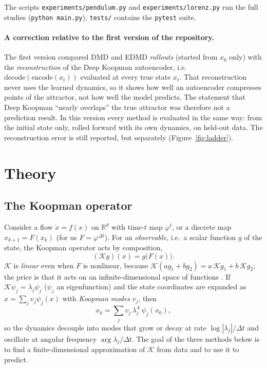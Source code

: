 \documentclass[11pt,a4paper]{article}
\newcommand{\R}{\mathbb{R}}
\newcommand{\Kop}{\mathcal{K}}
\newcommand{\code}[1]{\texttt{#1}}
\begin{document}
The scripts \code{experiments/pendulum.py} and \code{experiments/lorenz.py} run the full studies
(\code{python main.py}); \code{tests/} contains the \code{pytest} suite.

\paragraph{A correction relative to the first version of the repository.}
The first version compared DMD and EDMD \emph{rollouts} (started from $x_0$ only) with the
\emph{reconstruction} of the Deep Koopman autoencoder, i.e.\ $\mathrm{decode}(\mathrm{encode}(x_t))$
evaluated at every true state $x_t$. That reconstruction never uses the learned dynamics, so it
shows how well an autoencoder compresses points of the attractor, not how well the model predicts.
The statement that Deep Koopman ``nearly overlaps'' the true attractor was therefore not a
prediction result. In this version every method is evaluated in the same way: from the initial state
only, rolled forward with its own dynamics, on held-out data. The reconstruction error is still
reported, but separately (Figure~\ref{fig:ladder}).

\section{Theory}
\subsection{The Koopman operator}
Consider a flow $\dot x=f(x)$ on $\R^d$ with time-$t$ map $\varphi^t$, or a discrete map
$x_{k+1}=F(x_k)$ (for us $F=\varphi^{\Delta t}$). For an \emph{observable}, i.e.\ a scalar function
$g$ of the state, the Koopman operator acts by composition,
\begin{equation}
  (\Kop g)(x) = g\bigl(F(x)\bigr).
\end{equation}
$\Kop$ is \emph{linear} even when $F$ is nonlinear, because $\Kop(a g_1+b g_2)=a\,\Kop g_1+b\,\Kop g_2$;
the price is that it acts on an infinite-dimensional space of functions
\cite{Koopman1931,Brunton2022}. If $\Kop\psi_j=\lambda_j\psi_j$ ($\psi_j$ an eigenfunction) and the
state coordinates are expanded as $x=\sum_j v_j\psi_j(x)$ with \emph{Koopman modes} $v_j$, then
\begin{equation}
  x_k=\sum_j v_j\,\lambda_j^{\,k}\,\psi_j(x_0),
\end{equation}
so the dynamics decouple into modes that grow or decay at rate $\log|\lambda_j|/\Delta t$ and oscillate at
angular frequency $\arg\lambda_j/\Delta t$. The goal of the three methods below is to find a finite-dimensional
approximation of $\Kop$ from data and to use it to predict.
\end{document}

